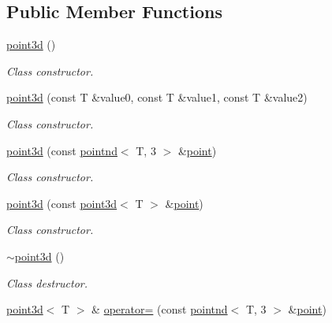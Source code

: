 \subsection*{Public Member Functions}
\begin{DoxyCompactItemize}
\item 
\mbox{\label{classacme_1_1point3d_a6c02c53c7b8bd7d182e4a30e33bb3651}} 
\hyperlink{classacme_1_1point3d_a6c02c53c7b8bd7d182e4a30e33bb3651}{point3d} ()
\begin{DoxyCompactList}\small\item\em Class constructor. \end{DoxyCompactList}\item 
\hyperlink{classacme_1_1point3d_a11ad282f54092ff2b4cd440722268c07}{point3d} (const T \&value0, const T \&value1, const T \&value2)
\begin{DoxyCompactList}\small\item\em Class constructor. \end{DoxyCompactList}\item 
\hyperlink{classacme_1_1point3d_ad8106a84822af4431c6b899656e3af06}{point3d} (const \hyperlink{classacme_1_1pointnd}{pointnd}$<$ T, 3 $>$ \&\hyperlink{classacme_1_1point}{point})
\begin{DoxyCompactList}\small\item\em Class constructor. \end{DoxyCompactList}\item 
\hyperlink{classacme_1_1point3d_abd49fc12054b5a19c13973f9d0abcf3d}{point3d} (const \hyperlink{classacme_1_1point3d}{point3d}$<$ T $>$ \&\hyperlink{classacme_1_1point}{point})
\begin{DoxyCompactList}\small\item\em Class constructor. \end{DoxyCompactList}\item 
\mbox{\label{classacme_1_1point3d_a2f2bb6249494c61c600aaa37f674d864}} 
\hyperlink{classacme_1_1point3d_a2f2bb6249494c61c600aaa37f674d864}{$\sim$point3d} ()
\begin{DoxyCompactList}\small\item\em Class destructor. \end{DoxyCompactList}\item 
\hyperlink{classacme_1_1point3d}{point3d}$<$ T $>$ \& \hyperlink{classacme_1_1point3d_ae4d80a128a282ef6b98560c5932abe13}{operator=} (const \hyperlink{classacme_1_1pointnd}{pointnd}$<$ T, 3 $>$ \&\hyperlink{classacme_1_1point}{point})

\end{DoxyCompactItemize}
